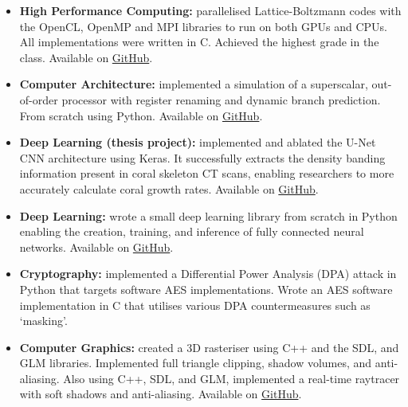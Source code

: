 \vspace{-1.1em}


\vspace{0.2em}

\begin{cvparagraph}

\begin{itemize}[leftmargin=*]
    \itemsep-0.6em
    \item {\textbf{High Performance Computing:} parallelised Lattice-Boltzmann codes with the OpenCL, OpenMP and MPI libraries to run on both GPUs and CPUs. All implementations were written in C. Achieved the highest grade in the class. Available on \href{https://github.com/ainsleyrutterford/HPC-OpenCL}{GitHub}.}
    \item {\textbf{Computer Architecture:} implemented a simulation of a superscalar, out-of-order processor with register renaming and dynamic branch prediction. From scratch using Python. Available on \href{https://github.com/ainsleyrutterford/Superscalar}{GitHub}.}
    \item{\textbf{Deep Learning (thesis project):} implemented and ablated the U-Net CNN architecture using Keras. It successfully extracts the density banding information present in coral skeleton CT scans, enabling researchers to more accurately calculate coral growth rates. Available on \href{https://github.com/ainsleyrutterford/Thesis}{GitHub}.}
    \item{\textbf{Deep Learning:} wrote a small deep learning library from scratch in Python enabling the creation, training, and inference of fully connected neural networks. Available on \href{https://github.com/ainsleyrutterford/tinyNet}{GitHub}.}
    \item {\textbf{Cryptography:} implemented a Differential Power Analysis (DPA) attack in Python that targets software AES implementations. Wrote an AES software implementation in C that utilises various DPA countermeasures such as ‘masking’.}
    \item {\textbf{Computer Graphics:} created a 3D rasteriser using C++ and the SDL, and GLM libraries. Implemented full triangle clipping, shadow volumes, and anti-aliasing. Also using C++, SDL, and GLM, implemented a real-time raytracer with soft shadows and anti-aliasing. Available on \href{https://github.com/ainsleyrutterford/Rasteriser}{GitHub}.}
\end{itemize}

\end{cvparagraph}
